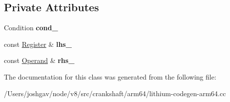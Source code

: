 \subsection*{Private Attributes}
\begin{DoxyCompactItemize}
\item 
Condition {\bfseries cond\+\_\+}\hypertarget{classv8_1_1internal_1_1_compare_and_branch_abbfcef677cc99513618876f211285bee}{}\label{classv8_1_1internal_1_1_compare_and_branch_abbfcef677cc99513618876f211285bee}

\item 
const \hyperlink{structv8_1_1internal_1_1_register}{Register} \& {\bfseries lhs\+\_\+}\hypertarget{classv8_1_1internal_1_1_compare_and_branch_a0b93c23f34cd29ab8818ced94cc6190d}{}\label{classv8_1_1internal_1_1_compare_and_branch_a0b93c23f34cd29ab8818ced94cc6190d}

\item 
const \hyperlink{classv8_1_1internal_1_1_operand}{Operand} \& {\bfseries rhs\+\_\+}\hypertarget{classv8_1_1internal_1_1_compare_and_branch_ab7b4177b3aa957a5b5db36fe4a76a658}{}\label{classv8_1_1internal_1_1_compare_and_branch_ab7b4177b3aa957a5b5db36fe4a76a658}

\end{DoxyCompactItemize}


The documentation for this class was generated from the following file\+:\begin{DoxyCompactItemize}
\item 
/\+Users/joshgav/node/v8/src/crankshaft/arm64/lithium-\/codegen-\/arm64.\+cc\end{DoxyCompactItemize}
